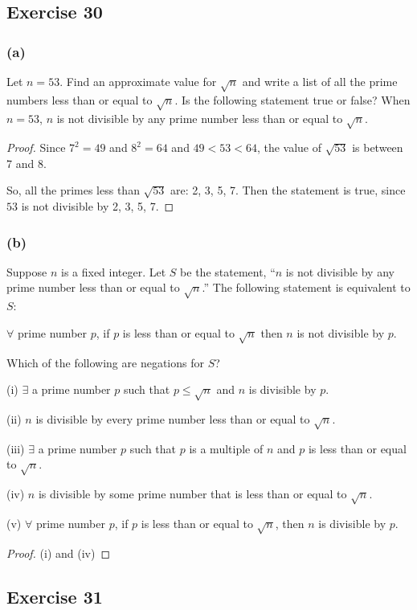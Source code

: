 \documentclass[14pt]{extarticle}
\newcommand{\fa}{\forall}
\newcommand{\te}{\exists}
\begin{document}
\subsection{Exercise 30}
\subsubsection{(a)}
Let $n = 53$. Find an approximate value for $\sqrt{n}$ and write a list of all the prime numbers less than or equal to $\sqrt{n}$. Is the following statement true or false? When $n = 53$, $n$ is not divisible by any prime number less than or equal to $\sqrt{n}$.

\begin{proof}
    Since $7^2 = 49$ and $8^2 = 64$ and $49 < 53 < 64$, the value of $\sqrt{53}$ is between 7 and 8.

    So, all the primes less than $\sqrt{53}$ are: 2, 3, 5, 7. Then the statement is true, since $53$ is not divisible by 2, 3, 5, 7.
\end{proof}

\subsubsection{(b)}
Suppose $n$ is a fixed integer. Let $S$ be the statement, “$n$ is not divisible by any prime number less than or equal to $\sqrt{n}$.” The following statement is equivalent to $S$:

$\fa$ prime number $p$, if $p$ is less than or equal to $\sqrt{n}$ then $n$ is not divisible by $p$.

Which of the following are negations for $S$?

(i) $\te$ a prime number $p$ such that $p \leq \sqrt{n}$ and $n$ is divisible by $p$.

(ii) $n$ is divisible by every prime number less than or equal to $\sqrt{n}$.

(iii) $\te$ a prime number $p$ such that $p$ is a multiple of $n$ and $p$ is less than or equal to $\sqrt{n}$.

(iv) $n$ is divisible by some prime number that is less than or equal to $\sqrt{n}$.

(v) $\fa$ prime number $p$, if $p$ is less than or equal to $\sqrt{n}$, then $n$ is divisible by $p$.

\begin{proof}
    (i) and (iv)
\end{proof}

\subsection{Exercise 31}
\end{document}
